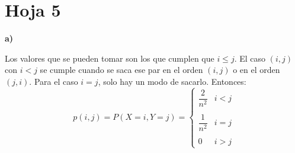 \documentclass[openany]{book}
\begin{document}
\chapter{Hoja 5}

    \setcounter{ex}{3}

\begin{exercise}

    \textbf{a)}

    Los valores que se pueden tomar son los que cumplen que $ i\leq j $. El caso $ (i,j) $ con $ i<j $ se cumple cuando se saca ese par en el orden $ (i,j) $ o en el orden $ (j,i) $. Para el caso $ i=j $, solo hay un modo de sacarlo. Entonces:
    $$ p(i,j) = P(X=i,Y=j) = \left\{
    \begin{array}{ll}
        \dfrac{2}{n^2} & i<j \\\\
        \dfrac{1}{n^2} & i = j \\ \\
        0 & i > j 
    \end{array}
    \right. $$


\end{exercise}
\end{document}

